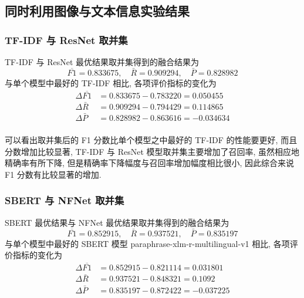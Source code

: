 \documentclass[12pt]{article}
\begin{document}
\subsection{同时利用图像与文本信息实验结果}

\subsubsection{TF-IDF 与 ResNet 取并集}

TF-IDF 与 ResNet 最优结果取并集得到的融合结果为
\begin{equation}
  \overline{F1}=0.833675,\quad\bar{R}=0.909294,\quad\bar{P}=0.828982
\end{equation}
与单个模型中最好的 TF-IDF 相比, 各项评价指标的变化为
\begin{equation}
  \begin{aligned}
    \Delta\overline{F1}&=0.833675-0.783220=0.050455\\
    \Delta\bar{R}&=0.909294-0.794429=0.114865\\
    \Delta\bar{P}&=0.828982-0.863616=-0.034634\\
  \end{aligned}
\end{equation}

可以看出取并集后的 F1 分数比单个模型之中最好的 TF-IDF 的性能要更好, 而且分数增加比较显著, TF-IDF 与 ResNet 模型取并集主要增加了召回率, 虽然相应地精确率有所下降, 但是精确率下降幅度与召回率增加幅度相比很小, 因此综合来说 F1 分数有比较显著的增加.

\subsubsection{SBERT 与 NFNet 取并集}

SBERT 最优结果与 NFNet 最优结果取并集得到的融合结果为
\begin{equation}
  \overline{F1}=0.852915,\quad\bar{R}=0.937521,\quad\bar{P}=0.835197
\end{equation}
与单个模型中最好的 SBERT 模型 paraphrase-xlm-r-multilingual-v1 相比, 各项评价指标的变化为
\begin{equation}
  \begin{aligned}
    \Delta\overline{F1}&=0.852915-0.821114=0.031801\\
    \Delta\bar{R}&=0.937521-0.848321=0.1092\\
    \Delta\bar{P}&=0.835197-0.872422=-0.037225\\
  \end{aligned}
\end{equation}
\end{document}
